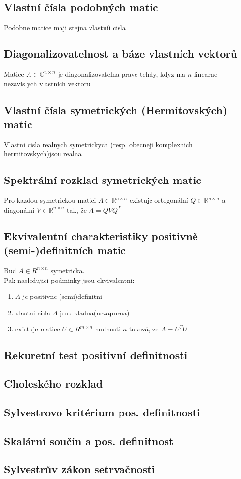 \documentclass[a4paper]{article}
\begin{document}
\subsection*{Vlastní čísla podobných matic}
Podobne matice maji stejna vlastníi cisla


\subsection*{Diagonalizovatelnost a báze vlastních vektorů}
Matice $A \in \mathbb{C}^{n\times n}$
je diagonalizovatelna prave tehdy,
kdyz ma $n$ linearne nezavislych vlastnich vektoru


\subsection*{Vlastní čísla symetrických (Hermitovských) matic}
Vlastni cisla realnych symetrickych (resp. obecneji komplexnich hermitovskych)jsou realna


\subsection*{Spektrální rozklad symetrických matic}
Pro kazdou symetrickou matici $A \in \mathbb{R}^{n\times n}$
existuje ortogonální $Q \in \mathbb{R}^{n\times n}$ a diagonální
$V \in \mathbb{R}^{n\times n}$
tak, že $A = QVQ^T$


\subsection*{Ekvivalentní charakteristiky positivně (semi-)definitních matic}
Bud $A \in R^{n\times n}$ symetricka.\\
Pak nasledujici podminky jsou ekvivalentni:
\begin{enumerate}
	\item $A$ je positivne (semi)definitni
	\item vlastni cisla $A$ jsou kladna(nezaporna)
	\item existuje matice $U \in R^{m\times n}$ hodnosti $n$ taková, ze $A = U^TU$
\end{enumerate}


\subsection*{Rekuretní test positivní definitnosti}



\subsection*{Choleského rozklad}



\subsection*{Sylvestrovo kritérium pos. definitnosti}



\subsection*{Skalární součin a pos. definitnost}



\subsection*{Sylvestrův zákon setrvačnosti}
\end{document}
